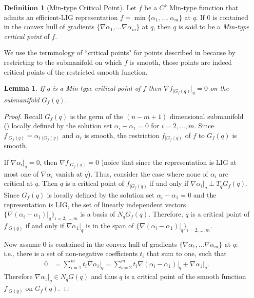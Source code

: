 \documentclass[11pt]{article}
\theoremstyle{plain}
\newtheorem{lem}{Lemma}
\theoremstyle{definition}
\newtheorem{defi}{Definition}
\theoremstyle{remark}
\begin{document}
\begin{defi}[Min-type Critical Point]\label{def:q_mintype_crit}  Let $f$ be a $C^k$ Min-type function that admits an efficient-LIG representation $f = \min \{ \alpha_1, \ldots, \alpha_m\}$ at $q$. If $0$ is contained in the convex hull of gradients $\{ \nabla \alpha_1 ,\ldots  \nabla \alpha_m \}$ at $q$, then $q$ is said to be a \emph{Min-type critical point} of $f$.
\end{defi}

We use the terminology of ``critical points" for points described in  because by restricting to the submanifold on which $f$ is smooth, those points are indeed critical points of the restricted smooth function.

\begin{lem} \label{lem:q_mintype_crit} If $q$ is a Min-type critical point of $f$ then $\nabla f_{\rvert G_f(q)}\rvert_q= 0$ on the submanifold $G_f(q)$.
\end{lem}

\begin{proof}
Recall $G_f(q)$ is the germ of the $(n-m+1)$ dimensional submanifold () locally defined by the solution set  $\alpha_i - \alpha_1 = 0$ for $i= 2,\ldots, m$. Since $f_{\rvert G_f(q)} = \alpha_i {\ }_{\rvert G_f(q)}$ and $\alpha_i$ is smooth, the restriction $f_{\rvert G_f(q)}$ of $f$ to $G_f(q)$ is smooth. 

If $\nabla \alpha_i\rvert_q = 0$,  then $\nabla f_{\rvert G_f(q)} = 0$ (noice that since the representation is LIG at most one of $ \nabla \alpha_i$ vanish at $q$). Thus, consider the case where none of $\alpha_i$ are critical at $q$. Then $q$ is a critical point of $f_{\rvert G_f(q)}$ if and only if $\nabla \alpha_i\rvert_{q} \perp T_q G_f(q)$. Since $G_f(q)$ is locally defined by the solution set  $\alpha_i - \alpha_1 = 0$ and the representation is LIG, the set of linearly independent vectors $\{\nabla (\alpha_i -  \alpha_1)\rvert_{q}\}_{i= 2,\ldots, m}$ is a basis of $N_qG_f(q)$. Therefore, $q$ is a critical point of $f_{\rvert G(q)}$ if and only if $\nabla  \alpha_1\rvert_{q}$ is in the span of $\{\nabla (\alpha_i -  \alpha_1)\rvert_{q}\}_{i= 2,\ldots, m}$. 

Now assume $0$ is contained in the convex hull of gradients $\{ \nabla \alpha_1 ,\ldots  \nabla \alpha_m \}$ at $q$: i.e., there is a set of non-negative coefficients $t_i$ that sum to one, such that
\begin{align*}
0 &= \sum_{i=1}^m t_i \nabla \alpha_i \rvert_{q} =  \sum_{i= 2}^m t_i \nabla (\alpha_i - \alpha_1) \rvert_{q} + \nabla  \alpha_1\rvert_{q}.
\end{align*}
Therefore $\nabla  \alpha_1\rvert_{q} \in N_q G(q)$ and thus $q$ is a critical point of the smooth function $f_{\rvert G(q)}$ on $G_f(q)$.
\end{proof}
\end{document}
